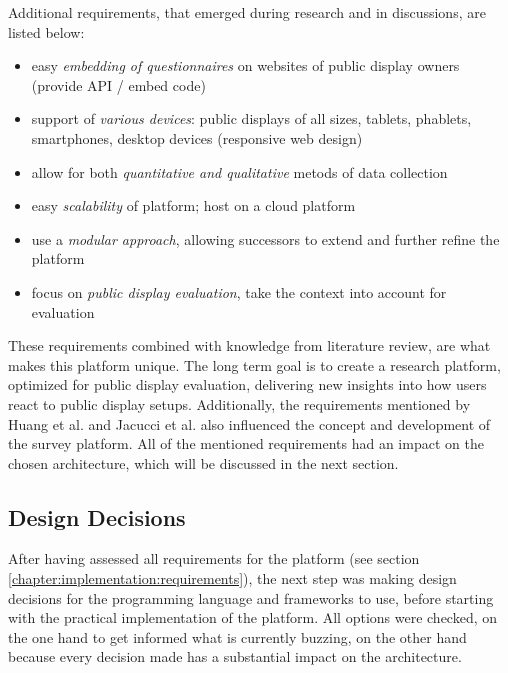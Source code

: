 	Additional requirements, that emerged during research and in discussions, are listed below:

	\begin{itemize}[itemsep=0pt] 
	\item easy \textit{embedding of questionnaires} on websites of public display owners (provide API / embed code)
	\item support of \textit{various devices}: public displays of all sizes, tablets, phablets, smartphones, desktop devices (responsive web design)
	\item allow for both \textit{quantitative and qualitative} metods of data collection
	\item easy \textit{scalability} of platform; host on a cloud platform
	\item use a \textit{modular approach}, allowing successors to extend and further refine the platform
	\item focus on \textit{public display evaluation}, take the context into account for evaluation
	\end{itemize}

	These requirements combined with knowledge from literature review, are what makes this platform unique. The long term goal is to create a research platform, optimized for public display evaluation, delivering new insights into how users react to public display setups. Additionally, the requirements mentioned by Huang et al. \cite{huang2008overcoming} and Jacucci et al. \cite{jacucci2010worldsofinformation} also influenced the concept and development of the survey platform. All of the mentioned requirements had an impact on the chosen architecture, which will be discussed in the next section.



\subsection{Design Decisions}
\label{chapter:implementation:design-decisions}

	After having assessed all requirements for the platform (see section \ref{chapter:implementation:requirements}), the next step was making design decisions for the programming language and frameworks to use, before starting with the practical implementation of the platform. All options were checked, on the one hand to get informed what is currently buzzing, on the other hand because every decision made has a substantial impact on the architecture.


